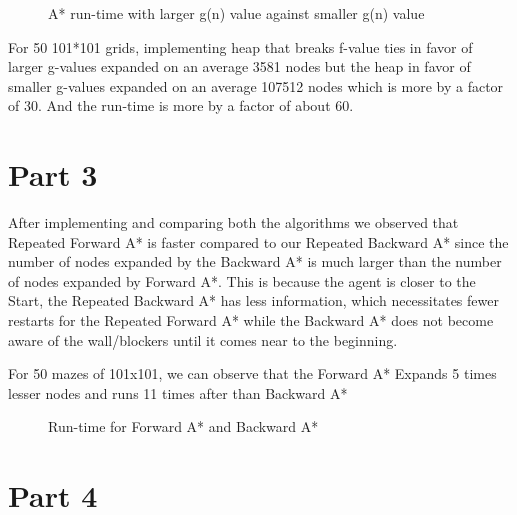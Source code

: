 \documentclass{article}
\begin{document}
\begin{figure}[!ht]
    \centering
    \caption{A* run-time with larger g(n) value against smaller g(n) value}
    \label{fig:my_label}
\end{figure}

For 50 101*101 grids, implementing heap that breaks f-value ties in favor of larger g-values expanded on an average 3581 nodes but the heap in favor of smaller g-values expanded on an average 107512 nodes which is more by a factor of 30.
And the run-time is more by a factor of about 60.


\section*{Part 3}

After implementing and comparing both the algorithms we observed that Repeated Forward A* is faster compared to our Repeated Backward A* since the number of nodes expanded by the Backward A* is much larger than the number of nodes expanded by Forward A*. This is because the agent is closer to the Start, the Repeated Backward A* has less information, which necessitates fewer restarts for the Repeated Forward A* while the Backward A* does not become aware of the wall/blockers until it comes near to the beginning.

For 50 mazes of 101x101, we can observe that the Forward A* Expands 5 times lesser nodes and runs 11 times after than Backward A*  

\begin{figure}[!ht]
    \centering
    \caption{Run-time for Forward A* and Backward A*}
    \label{fig:my_label}
\end{figure}

\section*{Part 4}
\end{document}
